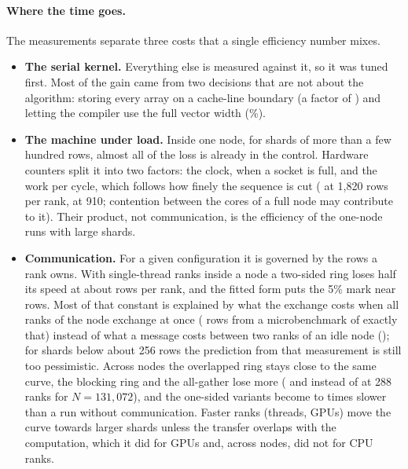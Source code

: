 \paragraph{Where the time goes.} The measurements separate three costs that a
single efficiency number mixes.
\begin{itemize}
\item \textbf{The serial kernel.} Everything else is measured against it, so it
was tuned first. Most of the gain came from two decisions that are not about the
algorithm: storing every array on a cache-line boundary (a factor of
) and letting the compiler use the full vector width
(\%).
\item \textbf{The machine under load.} Inside one node, for shards of more than a
few hundred rows, almost all of the loss is already in the control. Hardware
counters split it into two factors: the clock,  when a socket is
full, and the work per cycle, which follows how finely the sequence is cut
( at 1{,}820 rows per rank,  at 910; contention
between the cores of a full node may contribute to it). Their
product, not communication, is the efficiency of the one-node runs with large
shards.
\item \textbf{Communication.} For a given configuration it is governed by the rows
a rank owns. With single-thread ranks inside a node a two-sided ring loses half its
speed at about  rows per rank, and the fitted form puts the 5\%
mark near  rows. Most of that constant is explained by what the
exchange costs when all ranks of the node exchange at once ( rows
from a microbenchmark of exactly that) instead of what a message costs between two
ranks of an idle node (); for shards below about 256 rows the
prediction from that measurement is still too pessimistic. Across nodes the overlapped ring stays close to
the same curve, the blocking ring and the all-gather lose more
( and  instead of
 at 288 ranks for $N=131{,}072$), and the one-sided variants
become  to  times
slower than a run without communication. Faster ranks (threads, GPUs) move the
curve towards larger shards unless the transfer overlaps with the computation,
which it did for GPUs and, across nodes, did not for CPU ranks.
\end{itemize}

